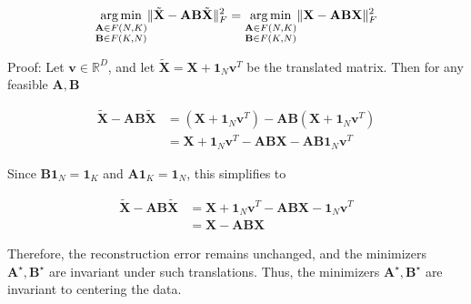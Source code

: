 \documentclass[oneside]{article}
\begin{document}
\begin{equation}
    \underset{\begin{subarray}{c} \mathbf{A} \in F(N, K) \\ \mathbf{B} \in F(K, N) \end{subarray}}{\arg \min} \| \tilde{\mathbf{X}} - \mathbf{A} \mathbf{B} \tilde{\mathbf{X}} \|_F^2 
    = 
    \underset{\begin{subarray}{c} \mathbf{A} \in F(N, K) \\ \mathbf{B} \in F(K, N) \end{subarray}}{\arg \min} \| \mathbf{X} - \mathbf{A} \mathbf{B} \mathbf{X}\|_F^2 
\end{equation}

Proof: Let $\mathbf{v} \in \mathbb{R}^{D}$, and let $\tilde{\mathbf{X}} = \mathbf{X} + \mathbf{1}_N \mathbf{v}^T$ be the translated matrix. Then for any feasible $\mathbf{A}, \mathbf{B}$

\begin{equation}
    \begin{aligned}
    \tilde{\mathbf{X}} - \mathbf{A} \mathbf{B} \tilde{\mathbf{X}} 
    &= \left(\mathbf{X} + \mathbf{1}_N \mathbf{v}^T \right) - \mathbf{A} \mathbf{B} \left(\mathbf{X} + \mathbf{1}_N \mathbf{v}^T \right) \\
    &= \mathbf{X} + \mathbf{1}_N \mathbf{v}^T - \mathbf{A} \mathbf{B} \mathbf{X} -  \mathbf{A} \mathbf{B} \mathbf{1}_N \mathbf{v}^T
    \end{aligned}
\end{equation}

Since $\mathbf{B} \mathbf{1}_N = \mathbf{1}_K$ and  $\mathbf{A} \mathbf{1}_K = \mathbf{1}_N$, this simplifies to 

\begin{equation}
    \begin{aligned}
    \tilde{\mathbf{X}} - \mathbf{A} \mathbf{B} \tilde{\mathbf{X}}
    &= \mathbf{X} + \mathbf{1}_N \mathbf{v}^T - \mathbf{A} \mathbf{B} \mathbf{X} - \mathbf{1}_N \mathbf{v}^T \\
    &= \mathbf{X} - \mathbf{A} \mathbf{B} \mathbf{X}
    \end{aligned}
\end{equation}

Therefore, the reconstruction error remains unchanged, and the minimizers $\mathbf{A}^\star, \mathbf{B}^\star$ are invariant under such translations. Thus, the minimizers $\mathbf{A}^\star, \mathbf{B}^\star$ are invariant to centering the data.
\end{document}
